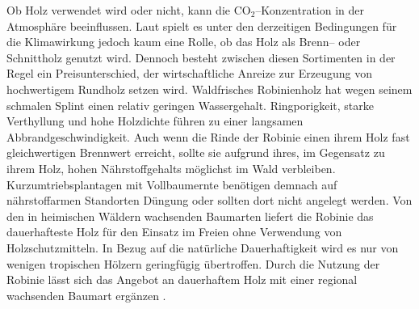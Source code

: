 \documentclass[twocolumn]{scrartcl}
\begin{document}
Ob Holz verwendet wird oder nicht, kann die CO$_2$--Konzentration in
der Atmosphäre beeinflussen. Laut
\citet{boiger2024schnittholzBrennholz} spielt es unter den derzeitigen
Bedingungen für die Klimawirkung jedoch kaum eine Rolle, ob das Holz
als Brenn-- oder Schnittholz genutzt wird. Dennoch besteht zwischen
diesen Sortimenten in der Regel ein Preisunterschied, der
wirtschaftliche Anreize zur Erzeugung von hochwertigem Rundholz setzen
wird. Waldfrisches Robinienholz hat wegen seinem schmalen Splint einen
relativ geringen Wassergehalt.  Ringporigkeit, starke Verthyllung und
hohe Holzdichte führen zu einer langsamen Abbrandgeschwindigkeit.
Auch wenn die Rinde der Robinie einen ihrem Holz fast gleichwertigen
Brennwert erreicht, sollte sie aufgrund ihres, im Gegensatz zu ihrem
Holz, hohen Nährstoffgehalts möglichst im Wald verbleiben.
Kurzumtriebsplantagen mit Vollbaumernte benötigen demnach auf
nährstoffarmen Standorten Düngung oder sollten dort nicht angelegt
werden.  Von den in heimischen Wäldern wachsenden Baumarten liefert
die Robinie das dauerhafteste Holz für den Einsatz im Freien ohne
Verwendung von Holzschutzmitteln. In Bezug auf die natürliche
Dauerhaftigkeit wird es nur von wenigen tropischen Hölzern geringfügig
übertroffen. Durch die Nutzung der Robinie lässt sich das Angebot an
dauerhaftem Holz mit einer regional wachsenden Baumart ergänzen
\citep{benthien2020robinieTropenholz}.
\end{document}
